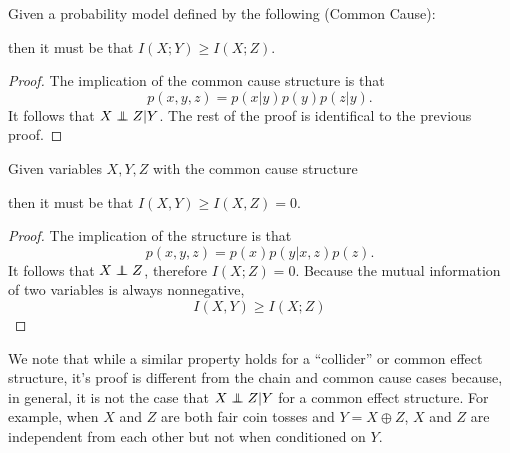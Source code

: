 \documentclass[../thesis.tex]{subfiles}
\begin{document}
\begin{thm}
  Given a probability model defined by the following (Common Cause):
  \begin{center}
  \end{center}
  then it must be that $I(X;Y) \geq I(X;Z)$.
\end{thm}
\begin{proof}
  The implication of the common cause structure is that
  \begin{equation}
    p(x,y,z) = p(x \vert y )p(y)p(z \vert y).
  \end{equation}
  It follows that $X \independent Z \vert Y$.
  The rest of the proof is identifical to the previous proof.
\end{proof}

\begin{thm}
  Given variables $X,Y,Z$ with
the common cause structure
\begin{center}
\end{center}
  then it must be that $I(X,Y) \geq I(X,Z) = 0$.
\end{thm}
\begin{proof}
  The implication of the structure is that
  \begin{equation}
    p(x,y,z) = p(x) p(y \vert x,z) p(z).
  \end{equation}
  It follows that $X \independent Z$, therefore $I(X;Z) = 0$.
  Because the mutual information of two variables is always
  nonnegative, 
  $$I(X,Y) \geq I(X;Z)$$
\end{proof}

We note that while a similar property holds for a
``collider'' or common effect structure, it's proof is different
from the chain and common cause cases because, in general,
it is not the case that $X \independent Z \vert Y$ for
a common effect structure.
For example, when $X$ and $Z$ are both fair coin tosses
and $Y = X \oplus Z$, $X$ and $Z$ are independent from each other
but not when conditioned on $Y$.
\end{document}
